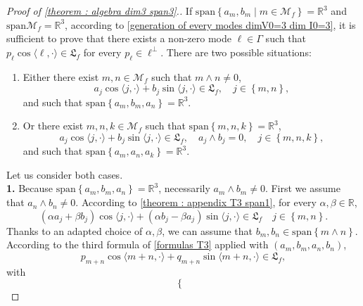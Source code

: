 \documentclass[10pt,a4paper]{amsart}
\newcommand{\M}{{\mathcal M}}
\newcommand{\R}{{\mathbb R}}
\newcommand{\la}{\langle}
\newcommand{\ra}{\rangle}
\newcommand{\we}{\wedge}
\begin{document}
\begin{proof}[Proof of \cref{theorem : algebra dim3 span3}.]
    If $\mathrm{span}\left\{a_m,b_m \mid m \in \M_f\right\}=\R^3$ and $\mathrm{span}\M_f=\R^3$, according to \cref{generation of every modes dimV0=3 dim I0=3}, it is sufficient to prove that there exists a non-zero mode $\ell \in \Gamma$ such that $p_\ell \cos \la \ell,\cdot \ra \in \mathfrak{L}_f $ for every $p_{\ell}\in \ell^{\perp}$. There are two possible situations: 
    \begin{enumerate}
        \item[1.] Either there exist $m,n\in \M_f$ such that $m\we n \neq 0$, 
        \begin{equation*}
            a_j\cos \la j,\cdot \ra +b_j \sin \la j,\cdot \ra \in \mathfrak{L}_f, \quad j\in \left\{m,n\right\},
        \end{equation*}
        and such that $\mathrm{span} \left\{a_m,b_m,a_n\right\}=\R^3$. 
        \item[2.] Or there exist $m,n,k\in \M_f$ such that $\mathrm{span} \left\{m,n,k\right\}=\R^3$, 
        \begin{equation}
            a_j \cos \la j,\cdot \ra +b_j \sin \la j,\cdot \ra \in \mathfrak{L}_f, \quad a_j \we b_j =0, \quad j \in \left\{m,n,k\right\},
        \end{equation}
        and such that $\mathrm{span} \left\{a_m,a_n,a_k\right\}=\R^3$.
    \end{enumerate}
    Let us consider both cases. \\
    \textbf{1.} Because $\mathrm{span} \left\{a_m,b_m,a_n\right\}=\R^3$, necessarily $a_m\we b_m \neq 0$. First we assume that $a_n \we b_n \neq 0$. According to \cref{theorem : appendix T3 span1}, for every $\alpha,\beta\in \R$,
    \begin{equation*}
        (\alpha a_j+\beta b_j)\cos \la j,\cdot \ra +(\alpha b_j-\beta a_j)\sin \la j ,\cdot \ra \in \mathfrak{L}_f \quad j \in \left\{m,n\right\}.
    \end{equation*}
    Thanks to an adapted choice of $\alpha,\beta$, we can assume that $b_m,b_n \in \mathrm{span} \left\{m\we n\right\}$. According to the third formula of \cref{formulas T3} applied with $(a_m,b_m,a_n,b_n)$, 
    \begin{equation*}
        p_{m+n}\cos \la m+n,\cdot \ra+q_{m+n}\sin \la m+n,\cdot \ra \in \mathfrak{L}_f, 
    \end{equation*}
    with 
    \begin{equation*}
        \left\{\begin{array}{ll}

\end{array}
\end{equation*}
\end{proof}
\end{document}
